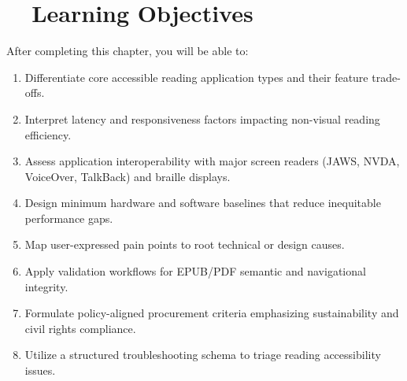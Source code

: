 \section{~~Learning Objectives}
\label{sec:sr27-learning-objectives}
After completing this chapter, you will be able to:
\begin{enumerate}
	\item Differentiate core accessible reading application types and their feature trade-offs.
	\item Interpret latency and responsiveness factors impacting non-visual reading efficiency.
	\item Assess application interoperability with major screen readers (JAWS, NVDA, VoiceOver, TalkBack) and braille displays.
	\item Design minimum hardware and software baselines that reduce inequitable performance gaps.
	\item Map user-expressed pain points to root technical or design causes.
	\item Apply validation workflows for EPUB/PDF semantic and navigational integrity.
	\item Formulate policy-aligned procurement criteria emphasizing sustainability and civil rights compliance.
	\item Utilize a structured troubleshooting schema to triage reading accessibility issues.
\end{enumerate}

